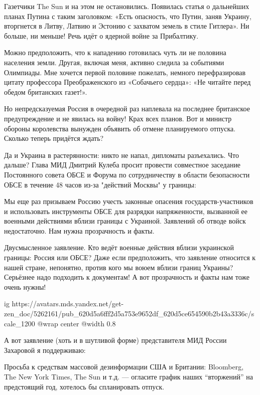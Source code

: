 Газетчики The Sun и на этом не остановились. Появилась статья о дальнейших
планах Путина с таким заголовком: «Есть опасность, что Путин, заняв Украину,
вторгнется в Литву, Латвию и Эстонию с захватом земель в стиле Гитлера». Ни
больше, ни меньше! Речь идёт о ядерной войне за Прибалтику.

Можно предположить, что к нападению готовилась чуть ли не половина населения
земли. Другая, включая меня, активно следила за событиями Олимпиады. Мне
хочется первой половине пожелать, немного перефразировав цитату профессора
Преображенского из «Собачьего сердца»: «Не читайте перед обедом британских
газет!».

Но непредсказуемая Россия в очередной раз наплевала на последнее британское
предупреждение и не явилась на войну! Крах всех планов. Вот и министр обороны
королевства вынужден объявить об отмене планируемого отпуска. Сколько теперь
придётся ждать?

Да и Украина в растерянности: никто не напал, дипломаты разъехались. Что
дальше? Глава МИД Дмитрий Кулеба просит провести совместное заседание
Постоянного совета ОБСЕ и Форума по сотрудничеству в области безопасности ОБСЕ
в течение 48 часов из-за "действий Москвы" у границы:

Мы еще раз призываем Россию учесть законные опасения государств-участников и
использовать инструменты ОБСЕ для разрядки напряженности, вызванной ее военными
действиями вблизи границы с Украиной. Заявлений об отводе войск недостаточно.
Нам нужна прозрачность и факты.

Двусмысленное заявление. Кто ведёт военные действия вблизи украинской границы:
Россия или ОБСЕ? Даже если предположить, что заявление относится к нашей
стране, непонятно, против кого мы воюем вблизи границ Украины? Серьёзнее надо
подходить к документам! А вот прозрачность и факты нам тоже очень нужны!

\ifcmt
  ig https://avatars.mds.yandex.net/get-zen_doc/5262161/pub_620d5a6fff2d5a753e9652df_620d5ce654590b2b43a3336c/scale_1200
  @wrap center
  @width 0.8
\fi

А вот заявление (хоть и в шутливой форме) представителя МИД России Захаровой я
поддерживаю:

\begin{zznagolos}
Просьба к средствам массовой дезинформации США и Британии: Bloomberg, The New
York Times, The Sun и т.д. — огласите график наших \enquote{вторжений} на
предстоящий год, хотелось бы спланировать отпуск.	
\end{zznagolos}

